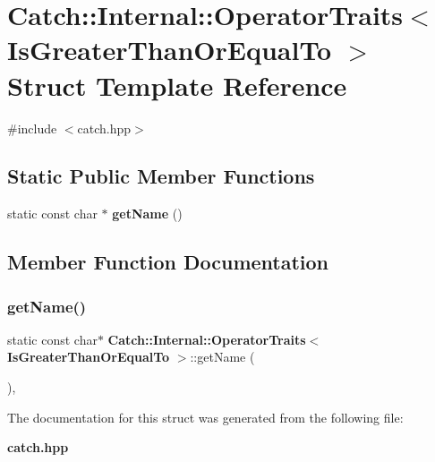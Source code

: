 \section{Catch\+:\+:Internal\+:\+:Operator\+Traits$<$ Is\+Greater\+Than\+Or\+Equal\+To $>$ Struct Template Reference}
\label{struct_catch_1_1_internal_1_1_operator_traits_3_01_is_greater_than_or_equal_to_01_4}


{\ttfamily \#include $<$catch.\+hpp$>$}

\subsection*{Static Public Member Functions}
\begin{DoxyCompactItemize}
\item 
static const char $\ast$ \textbf{ get\+Name} ()
\end{DoxyCompactItemize}


\subsection{Member Function Documentation}
\mbox{\label{struct_catch_1_1_internal_1_1_operator_traits_3_01_is_greater_than_or_equal_to_01_4_a76b6f6b0dbaf7d19ebb1b4b4891e719e}} 
\subsubsection{get\+Name()}
{\footnotesize\ttfamily static const char$\ast$ \textbf{ Catch\+::\+Internal\+::\+Operator\+Traits}$<$ \textbf{ Is\+Greater\+Than\+Or\+Equal\+To} $>$\+::get\+Name (\begin{DoxyParamCaption}{ }\end{DoxyParamCaption})\hspace{0.3cm}{\ttfamily [inline]}, {\ttfamily [static]}}



The documentation for this struct was generated from the following file\+:\begin{DoxyCompactItemize}
\item 
\textbf{ catch.\+hpp}\end{DoxyCompactItemize}
